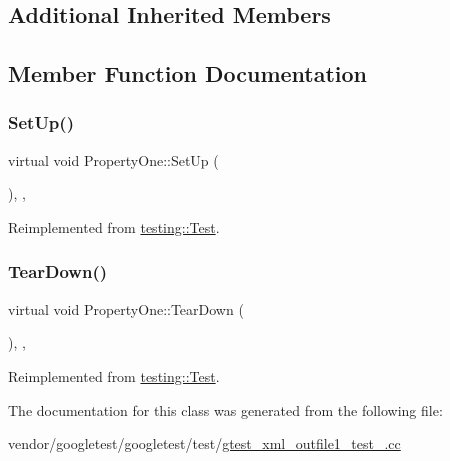 \subsection*{Additional Inherited Members}


\subsection{Member Function Documentation}
\mbox{\label{class_property_one_a9cb7d7cb508d5f1a6fc7cfead81ebc2b}} 
\subsubsection{\texorpdfstring{Set\+Up()}{SetUp()}}
{\footnotesize\ttfamily virtual void Property\+One\+::\+Set\+Up (\begin{DoxyParamCaption}{ }\end{DoxyParamCaption})\hspace{0.3cm}{\ttfamily [inline]}, {\ttfamily [protected]}, {\ttfamily [virtual]}}



Reimplemented from \hyperlink{classtesting_1_1_test_a190315150c303ddf801313fd1a777733}{testing\+::\+Test}.

\mbox{\label{class_property_one_a3ed895113848403d5ea27f52a1bb0545}} 
\subsubsection{\texorpdfstring{Tear\+Down()}{TearDown()}}
{\footnotesize\ttfamily virtual void Property\+One\+::\+Tear\+Down (\begin{DoxyParamCaption}{ }\end{DoxyParamCaption})\hspace{0.3cm}{\ttfamily [inline]}, {\ttfamily [protected]}, {\ttfamily [virtual]}}



Reimplemented from \hyperlink{classtesting_1_1_test_a5f0ab439802cbe0ef7552f1a9f791923}{testing\+::\+Test}.



The documentation for this class was generated from the following file\+:\begin{DoxyCompactItemize}
\item 
vendor/googletest/googletest/test/\hyperlink{gtest__xml__outfile1__test___8cc}{gtest\+\_\+xml\+\_\+outfile1\+\_\+test\+\_\+.\+cc}\end{DoxyCompactItemize}
